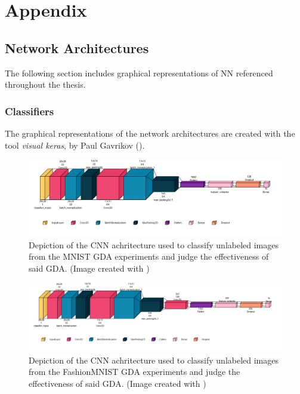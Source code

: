 \section*{Appendix}\label{appendix}

\setcounter{page}{1}

\subsection{Network Architectures}
The following section includes graphical representations of NN referenced throughout the thesis. %

\subsubsection{Classifiers}\label{appendix_classifiers}
The graphical representations of the network architectures are created with the tool \textit{visual keras}, by Paul Gavrikov (\cite{Gavrikov2020VisualKeras}).

\begin{figure}[htbp]
    \centering
    \vspace{-.5em}
    \includegraphics[width=.9\textwidth]{abb/netron_network_archs/classifying_Classifier_MNIST.png}
    \caption{Depiction of the CNN achritecture used to classify unlabeled images from the MNIST GDA experiments and judge the effectiveness of said GDA. (Image created with \cite{Gavrikov2020VisualKeras})}
    \label{fig:figure_class_mnist}
\end{figure}

\begin{figure}[htbp]
    \centering
    \vspace{-2em}
    \includegraphics[width=.9\textwidth]{abb/netron_network_archs/classifying_Classifier_FashionMNIST.png}
    \caption{Depiction of the CNN achritecture used to classify unlabeled images from the FashionMNIST GDA experiments and judge the effectiveness of said GDA. (Image created with \cite{Gavrikov2020VisualKeras})}
    \label{fig:figure_class_fashion}
\end{figure}

